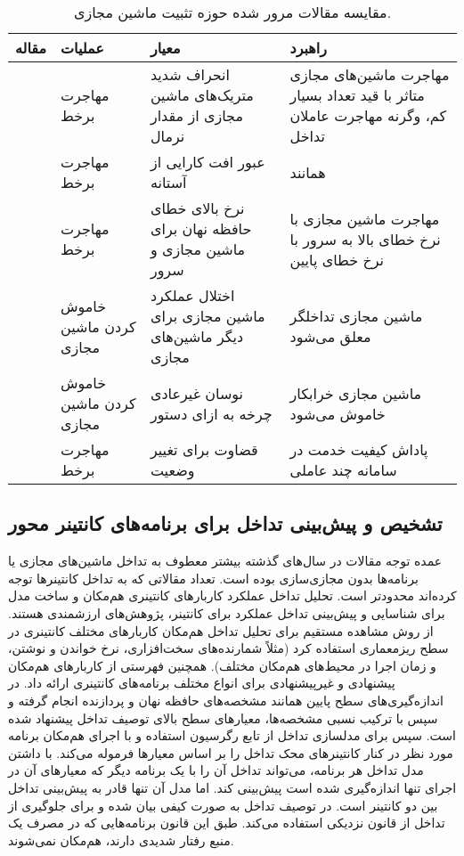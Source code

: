 \begin{table}[t]
\center
\caption{مقایسه مقالات مرور شده حوزه تثبیت ماشین مجازی.}
\begin{tabular}{|c|R{3cm}|p{5cm}|p{5cm}|}
\hline
مقاله & عملیات & معیار & راهبرد \\
\hline
\hline
\cite{novakovic2013deepdive} & مهاجرت برخط & انحراف شدید متریک‌های ماشین مجازی از مقدار نرمال & مهاجرت ماشین‌های مجازی متاثر با قید تعداد بسیار کم، وگرنه مهاجرت عاملان تداخل \\
\cite{wang2015vmon} & مهاجرت برخط & عبور افت کارایی از آستانه & همانند \cite{novakovic2013deepdive} \\
\cite{ahn2012dynamic} & مهاجرت برخط & نرخ بالای خطای حافظه نهان برای ماشین مجازی و سرور & مهاجرت ماشین مجازی با نرخ خطای  بالا به سرور با نرخ خطای  پایین \\
\cite{salimi2013batch} & خاموش کردن ماشین مجازی & اختلال عملکرد ماشین مجازی برای دیگر ماشین‌های مجازی & ماشین مجازی تداخلگر معلق می‌شود \\
\cite{Zhang2013CPI2} & خاموش کردن ماشین مجازی & نوسان غیرعادی چرخه به ازای دستور & ماشین مجازی خرابکار خاموش می‌شود \\
\cite{nishtala2020twig} & مهاجرت برخط & قضاوت  برای تغییر وضعیت & پاداش کیفیت خدمت در سامانه چند عاملی  \\
\hline
\end{tabular}
\label{table:litr_rev_consolidation}
\end{table}

\subsection{تشخیص و پیش‌بینی تداخل برای برنامه‌های کانتینر محور}

عمده توجه مقالات در سال‌های گذشته بیشتر معطوف به تداخل ماشین‌های مجازی یا برنامه‌ها بدون مجازی‌سازی بوده است. تعداد مقالاتی که به تداخل کانتینرها توجه کرده‌اند محدودتر است. تحلیل تداخل عملکرد کاربارهای کانتینری هم‌مکان و ساخت مدل برای شناسایی و پیش‌بینی تداخل عملکرد برای کانتینر، پژوهش‌های ارزشمندی هستند. \cite{chen2020interference} از روش مشاهده مستقیم برای تحلیل تداخل هم‌مکان کاربارهای مختلف کانتینری در سطح ریزمعماری استفاده کرد (مثلاً شمارنده‌های سخت‌افزاری، نرخ خواندن و نوشتن، و زمان اجرا در محیط‌های هم‌مکان مختلف). همچنین فهرستی از کاربارهای هم‌مکان پیشنهادی و غیرپیشنهادی برای انواع مختلف برنامه‌های کانتینری ارائه داد. در \cite{medel2023modeling} اندازه‌گیری‌های سطح پایین همانند مشخصه‌های حافظه نهان و پردازنده انجام گرفته و سپس با ترکیب نسبی مشخصه‌ها، معیارهای سطح بالای توصیف تداخل پیشنهاد شده است. سپس برای مدلسازی تداخل از تابع رگرسیون استفاده و با اجرای هم‌مکان برنامه مورد نظر در کنار کانتینرهای محک تداخل را بر اساس معیارها فرموله می‌کند. با داشتن مدل تداخل هر برنامه، می‌تواند تداخل آن را با یک برنامه دیگر که معیارهای آن در اجرای تنها اندازه‌گیری شده است پیش‌بینی کند. اما مدل آن تنها قادر به پیش‌بینی تداخل بین دو کانتینر است. در \cite{Kaur2020KEIDS} توصیف تداخل به صورت کیفی بیان شده و برای جلوگیری از تداخل از قانون نزدیکی استفاده می‌کند. طبق این قانون برنامه‌هایی که در مصرف یک منبع رفتار شدیدی دارند، هم‌مکان نمی‌شوند.


